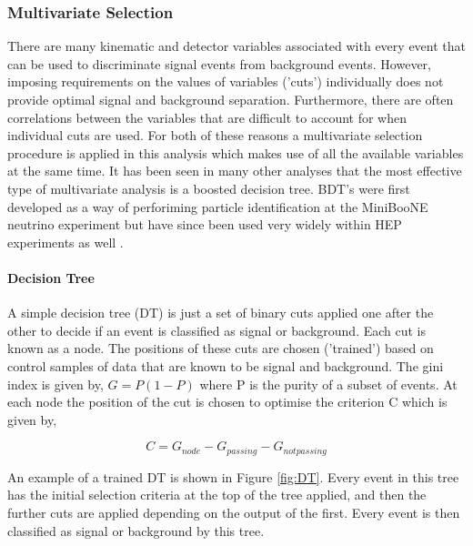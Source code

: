 \subsubsection{Multivariate Selection}
\label{sec:multivar}
There are many kinematic and detector variables associated with every event that can be used to discriminate signal events from background events.  However, imposing requirements on the values of variables ('cuts') individually does not provide optimal signal and background separation.  Furthermore, there are often correlations between the variables that are difficult to account for when individual cuts are used.  For both of these reasons a multivariate selection procedure is applied in this analysis which makes use of all the available variables at the same time.  It has been seen in many other \lhcb analyses that the most effective type of multivariate analysis is a boosted decision tree.  BDT's were first developed as a way of perforiming particle identification at the MiniBooNE neutrino experiment but have since been used very widely within HEP experiments as well \cite{2005NIMPA.555..370Y}.

\paragraph{Decision Tree}
A simple decision tree (DT) is just a set of binary cuts applied one after the other to decide if an event is classified as signal or background.  Each cut is known as a node. The positions of these cuts are chosen ('trained') based on control samples of data that are known to be signal and background.  The gini index is given by, $G=P(1-P)$ where P is the purity of a subset of events.  At each node the position of the cut is chosen to optimise the criterion C which is given by,

\begin{equation}
  C=G_{node}-G_{passing}-G_{not passing}
\end{equation}

An example of a trained DT is shown in Figure \ref{fig:DT}.  Every event in this tree has the initial selection criteria at the top of the tree applied, and then the further cuts are applied depending on the output of the first.  Every event is then classified as signal or background by this tree.

